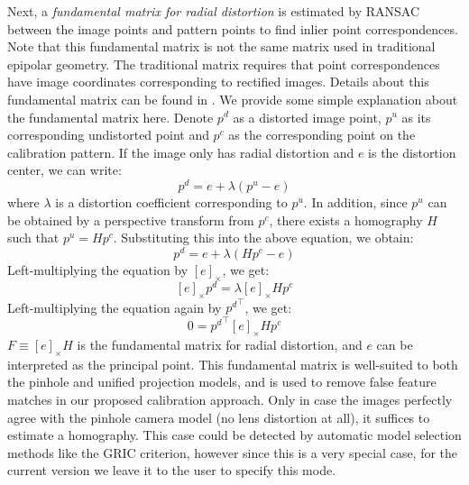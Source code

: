 \documentclass{report}
\begin{document}
Next, a \textit{fundamental matrix for radial distortion} is estimated by RANSAC between the image points and pattern points to find inlier point correspondences. Note that this fundamental matrix is not the same matrix used in traditional epipolar geometry. The traditional matrix requires that point correspondences have image coordinates corresponding to rectified images. Details about this fundamental matrix can be found in \cite{hartley2007parameter}. We provide some simple explanation about the fundamental matrix here. Denote $p^d$ as a distorted image point, $p^u$ as its corresponding undistorted point and $p^c$ as the corresponding point on the calibration pattern. If the image only has radial distortion and $e$ is the distortion center, we can write:
\begin{equation}
p^d = e + \lambda (p^u - e)
\end{equation}
where $\lambda$ is a distortion coefficient corresponding to $p^u$. In addition, since $p^u$ can be obtained by a perspective transform from $p^c$, there exists a homography $H$ such that $p^u = H p^c$. Substituting this into the above equation, we obtain: 
\begin{equation}
p^d = e + \lambda (H p^c - e)
\end{equation}
Left-multiplying the equation by $[e]_\times$, we get:
\begin{equation}
{}[e]_\times p^d = \lambda [e]_\times H p^c
\end{equation}
Left-multiplying the equation again by ${p^d}^\top$, we get:
\begin{equation}
0 = {p^d}^\top [e]_\times H p^c
\end{equation}
$F \equiv [e]_\times H$ is the fundamental matrix for radial distortion, and $e$ can be interpreted as the principal point. This fundamental matrix is well-suited to both the pinhole and unified projection models, and is used to remove false feature matches in our proposed calibration approach. Only in case the images perfectly agree with the pinhole camera model (no lens distortion at all), it suffices to estimate a homography.
This case could be detected by automatic model selection methods like the GRIC criterion\cite{torr1997assessment}, however since this is a very special case, for the current version we leave it to the user to specify this mode.
\end{document}
